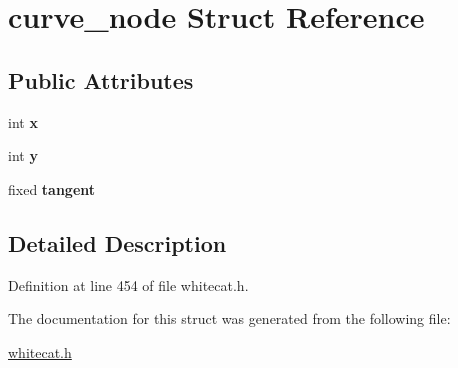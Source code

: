 \hypertarget{structcurve__node}{\section{curve\-\_\-node Struct Reference}
\label{structcurve__node}
}
\subsection*{Public Attributes}
\begin{DoxyCompactItemize}
\item 
\hypertarget{structcurve__node_aa7ae8f2ee3bbd3e6194785c392751cdb}{int {\bfseries x}}\label{structcurve__node_aa7ae8f2ee3bbd3e6194785c392751cdb}

\item 
\hypertarget{structcurve__node_afc1f4f007a920aa79c1f1f0ff0b49465}{int {\bfseries y}}\label{structcurve__node_afc1f4f007a920aa79c1f1f0ff0b49465}

\item 
\hypertarget{structcurve__node_a31ea7469070f7bb90ceae073d1d075a6}{fixed {\bfseries tangent}}\label{structcurve__node_a31ea7469070f7bb90ceae073d1d075a6}

\end{DoxyCompactItemize}


\subsection{Detailed Description}


Definition at line 454 of file whitecat.\-h.



The documentation for this struct was generated from the following file\-:\begin{DoxyCompactItemize}
\item 
\hyperlink{whitecat_8h}{whitecat.\-h}\end{DoxyCompactItemize}
